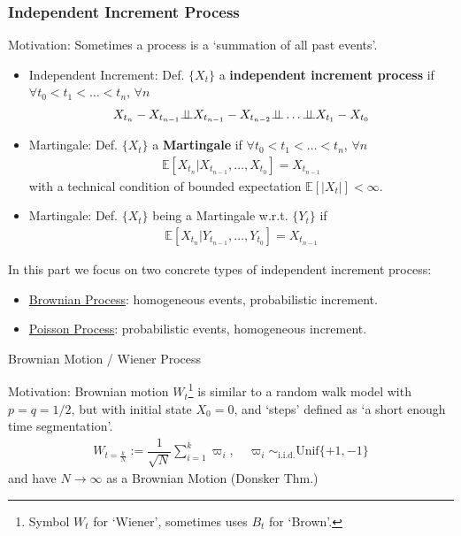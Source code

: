 \subsubsection{Independent Increment Process}\label{SubSubSectionIndepedentProcess}

Motivation: Sometimes a process is a `summation of all past events'.

\begin{itemize}[topsep=2pt,itemsep=0pt]
    \item Independent Increment: Def. $ \{X_t\} $ a \textbf{independent increment process} if $ \forall t_0<t_1<\ldots<t_n $, $ \forall n $
\begin{align}
    X_{t_{n}}-X_{t_{n-1}}\independent X_{t_{n-1}}-X_{t_{n-2}} \independent \ldots\independent X_{t_1}-X_{t_0}
\end{align}
    \item Martingale: Def. $ \{X_t\}  $ a \textbf{Martingale} if $ \forall t_0<t_1<\ldots<t_n $, $ \forall n $
    \begin{align}
        \mathbb{E}\left[ X_{t_n}|X_{t_{n-1}},\ldots,X_{t_0} \right] = X_{t_{n-1}} 
    \end{align}
    with a technical condition of bounded expectation $ \mathbb{E}\left[ |X_t| \right] <\infty $.
    \item Martingale: Def. $ \{X_t\}  $ being a Martingale w.r.t. $ \{Y_t\} $ if
    \begin{align}
        \mathbb{E}\left[ X_{t_n}|Y_{t_{n-1}},\ldots,Y_{t_0} \right] = X_{t_{n-1}} 
    \end{align}
\end{itemize}

In this part we focus on two concrete types of independent increment process:
\begin{itemize}[topsep=2pt,itemsep=0pt]
    \item \hyperlink{BrownianProcess}{Brownian Process}: homogeneous events, probabilistic increment.
    \item \hyperlink{PoissonProcess}{Poisson Process}: probabilistic events, homogeneous increment.
\end{itemize}

\begin{point}
    Brownian Motion / Wiener Process \hypertarget{BrownianProcess}{}
\end{point}

Motivation: Brownian motion $ W_t $\footnote{Symbol $ W_t $ for `Wiener', sometimes uses $ B_t $ for `Brown'.} is similar to a random walk model with $ p=q=1/2 $, but with initial state $ X_0=0 $, and `steps' defined as `a short enough time segmentation'.
\begin{align}
    W_{t=\frac{k}{N}}:= \dfrac{1}{\sqrt{N}} \sum_{i=1}^k \varpi _i,\quad \varpi _i\sim_{\mathrm{i.i.d.} } \mathrm{Unif}\{+1,-1\} 
\end{align}
and have $ N\to \infty $ as a Brownian Motion (Donsker Thm.)

